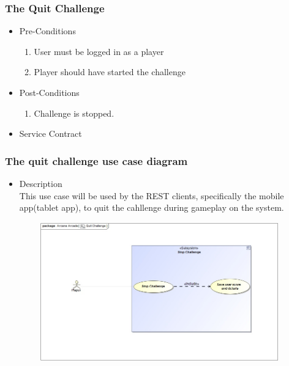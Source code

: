 \documentclass[english]{article}
\begin{document}
			\subsubsection{The Quit Challenge}
		
			\begin{itemize}
	
		
		\item Pre-Conditions
			\begin{enumerate}
				
				\item User must be logged in as a player
				\item Player should have started the challenge
			\end{enumerate}
		\item Post-Conditions
			\begin{enumerate}
			\item Challenge is stopped. 
						
			\end{enumerate}
		\item Service Contract
			\begin{figure}
			
			\end{figure}

		\end{itemize}
		
		
		\subsubsection* {The quit challenge use case diagram}
		\begin{itemize}
			\item Description\\
			This use case will be used by the REST clients, specifically the mobile app(tablet app), to quit the cahllenge during gameplay on the system.
		\end{itemize}	
		
		
		\includegraphics[width=14cm,height=6cm,keepaspectratio]{quitChallenge.jpg}
		
\end{document}
